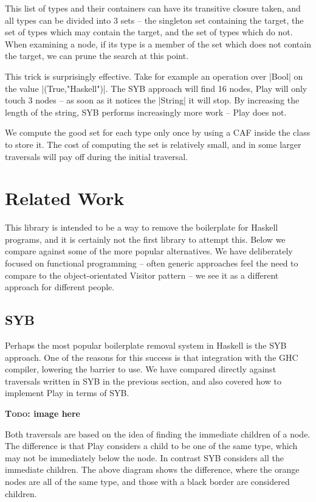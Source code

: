 \documentclass[preprint]{sigplanconf}
\newcommand{\todo}[1]{\textbf{\textsc{Todo:} #1}}
\begin{document}
This list of types and their containers can have its transitive closure taken, and all types can be divided into 3 sets -- the singleton set containing the target, the set of types which may contain the target, and the set of types which do not. When examining a node, if its type is a member of the set which does not contain the target, we can prune the search at this point.

This trick is surprisingly effective. Take for example an operation over |Bool| on the value |(True,"Haskell")|. The SYB approach will find 16 nodes, Play will only touch 3 nodes -- as soon as it notices the |String| it will stop. By increasing the length of the string, SYB performs increasingly more work -- Play does not.

We compute the good set for each type only once by using a CAF inside the class to store it. The cost of computing the set is relatively small, and in some larger traversals will pay off during the initial traversal.


\section{Related Work}
\label{sec:related}

This library is intended to be a way to remove the boilerplate for Haskell programs, and it is certainly not the first library to attempt this. Below we compare against some of the more popular alternatives. We have deliberately focused on functional programming -- often generic approaches feel the need to compare to the object-orientated Visitor pattern -- we see it as a different approach for different people.

\subsection{SYB}

Perhaps the most popular boilerplate removal system in Haskell is the SYB approach. One of the reasons for this success is that integration with the GHC compiler, lowering the barrier to use. We have compared directly against traversals written in SYB in the previous section, and also covered how to implement Play in terms of SYB.

\todo{image here}

Both traversals are based on the idea of finding the immediate children of a node. The difference is that Play considers a child to be one of the same type, which may not be immediately below the node. In contrast SYB considers all the immediate children. The above diagram shows the difference, where the orange nodes are all of the same type, and those with a black border are considered children.
\end{document}
